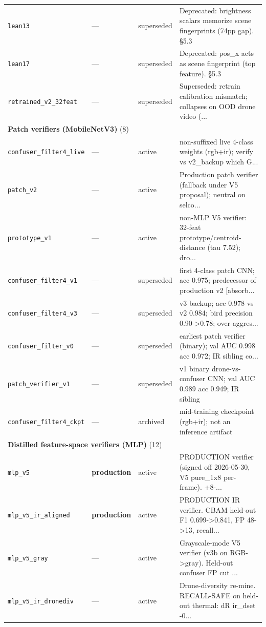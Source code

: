 \documentclass[12pt,a4paper,oneside,openright]{book}
\begin{document}
\begin{longtable}{p{}llp{}}
\texttt{lean13} & --- & superseded & Deprecated: brightness scalars memorize scene fingerprints (74pp gap). §5.3 \\
\texttt{lean17} & --- & superseded & Deprecated: pos\_x acts as scene fingerprint (top feature). §5.3 \\
\texttt{retrained\_v2\_32feat} & --- & superseded & Superseded: retrain calibration mismatch; collapses on OOD drone video (... \\
\midrule
\multicolumn{4}{l}{\textbf{Patch verifiers (MobileNetV3)} (8)} \\
\midrule
\texttt{confuser\_filter4\_live} & --- & active & non-suffixed live 4-class weights (rgb+ir); verify vs v2\_backup which G... \\
\texttt{patch\_v2} & --- & active & Production patch verifier (fallback under V5 proposal); neutral on selco... \\
\texttt{prototype\_v1} & --- & active & non-MLP V5 verifier: 32-feat prototype/centroid-distance (tau 7.52); dro... \\
\texttt{confuser\_filter4\_v1} & --- & superseded & first 4-class patch CNN; acc 0.975; predecessor of production v2 [absorb... \\
\texttt{confuser\_filter4\_v3} & --- & superseded & v3 backup; acc 0.978 vs v2 0.984; bird precision 0.90->0.78; over-aggres... \\
\texttt{confuser\_filter\_v0} & --- & superseded & earliest patch verifier (binary); val AUC 0.998 acc 0.972; IR sibling co... \\
\texttt{patch\_verifier\_v1} & --- & superseded & v1 binary drone-vs-confuser CNN; val AUC 0.989 acc 0.949; IR sibling \\
\texttt{confuser\_filter4\_ckpt} & --- & archived & mid-training checkpoint (rgb+ir); not an inference artifact \\
\midrule
\multicolumn{4}{l}{\textbf{Distilled feature-space verifiers (MLP)} (12)} \\
\midrule
\texttt{mlp\_v5} & \textbf{production} & active & PRODUCTION verifier (signed off 2026-05-30, V5 pure\_1x8 per-frame). +8-... \\
\texttt{mlp\_v5\_ir\_aligned} & \textbf{production} & active & PRODUCTION IR verifier. CBAM held-out F1 0.699->0.841, FP 48->13, recall... \\
\texttt{mlp\_v5\_gray} & --- & active & Grayscale-mode V5 verifier (v3b on RGB->gray). Held-out confuser FP cut ... \\
\texttt{mlp\_v5\_ir\_dronediv} & --- & active & Drone-diversity re-mine. RECALL-SAFE on held-out thermal: dR ir\_dset -0... \\

\end{longtable}
\end{document}
